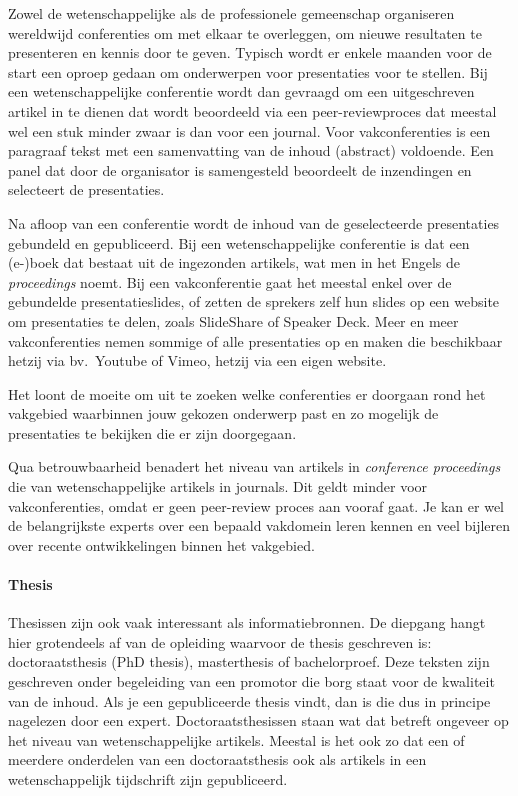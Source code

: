 Zowel de wetenschappelijke als de professionele gemeenschap organiseren wereldwijd conferenties om met elkaar te overleggen, om nieuwe resultaten te presenteren en kennis door te geven. Typisch wordt er enkele maanden voor de start een oproep gedaan om onderwerpen voor presentaties voor te stellen. Bij een wetenschappelijke conferentie wordt dan gevraagd om een uitgeschreven artikel in te dienen dat wordt beoordeeld via een peer-reviewproces dat meestal wel een stuk minder zwaar is dan voor een journal. Voor vakconferenties is een paragraaf tekst met een samenvatting van de inhoud (abstract) voldoende. Een panel dat door de organisator is samengesteld beoordeelt de inzendingen en selecteert de presentaties.

Na afloop van een conferentie wordt de inhoud van de geselecteerde presentaties gebundeld en gepubliceerd. Bij een wetenschappelijke conferentie is dat een (e-)boek dat bestaat uit de ingezonden artikels, wat men in het Engels de \emph{proceedings} noemt. Bij een vakconferentie gaat het meestal enkel over de gebundelde presentatieslides, of zetten de sprekers zelf hun slides op een website om presentaties te delen, zoals SlideShare of Speaker Deck. Meer en meer vakconferenties nemen sommige of alle presentaties op en maken die beschikbaar hetzij via bv.~Youtube of Vimeo, hetzij via een eigen website.

Het loont de moeite om uit te zoeken welke conferenties er doorgaan rond het vakgebied waarbinnen jouw gekozen onderwerp past en zo mogelijk de presentaties te bekijken die er zijn doorgegaan.

Qua betrouwbaarheid benadert het niveau van artikels in \emph{conference proceedings} die van wetenschappelijke artikels in journals. Dit geldt minder voor vakconferenties, omdat er geen peer-review proces aan vooraf gaat. Je kan er wel de belangrijkste experts over een bepaald vakdomein leren kennen en veel bijleren over recente ontwikkelingen binnen het vakgebied.

\paragraph{Thesis}

Thesissen zijn ook vaak interessant als informatiebronnen. De diepgang hangt hier grotendeels af van de opleiding waarvoor de thesis geschreven is: doctoraatsthesis (PhD thesis), masterthesis of bachelorproef. Deze teksten zijn geschreven onder begeleiding van een promotor die borg staat voor de kwaliteit van de inhoud. Als je een gepubliceerde thesis vindt, dan is die dus in principe nagelezen door een expert. Doctoraatsthesissen staan wat dat betreft ongeveer op het niveau van wetenschappelijke artikels. Meestal is het ook zo dat een of meerdere onderdelen van een doctoraatsthesis ook als artikels in een wetenschappelijk tijdschrift zijn gepubliceerd.


